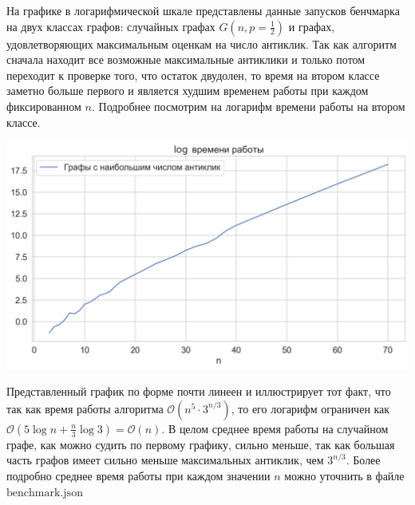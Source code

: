 \documentclass{article}
\begin{document}
На графике в логарифмической шкале представлены данные запусков бенчмарка на двух классах графов: случайных графах $G(n, p=\frac{1}{2})$ и
графах, удовлетворяющих максимальным оценкам на число антиклик. Так как алгоритм сначала находит все возможные максимальные антиклики и
только потом переходит к проверке того, что остаток двудолен, то время на втором классе заметно больше первого и является худшим временем работы при
каждом фиксированном $n$. Подробнее посмотрим на логарифм времени работы на втором классе.

\begin{center}
\includegraphics[scale=0.6]{plot1.png}
\end{center}
Представленный график по форме почти линеен и иллюстрирует тот факт, что так как время работы алгоритма $\mathcal{O}(n^5\cdot 3^{n/3})$, то его логарифм
ограничен как $\mathcal{O}(5\log n + \frac{n}{3}\log 3) = \mathcal{O}(n)$. В целом среднее время работы на случайном графе, как можно судить по первому
графику, сильно меньше, так как большая часть графов имеет сильно меньше максимальных антиклик, чем $3^{n/3}$. Более подробно среднее время работы при каждом
значении $n$ можно уточнить в файле $\mathrm{benchmark.json}$


\end{document}
